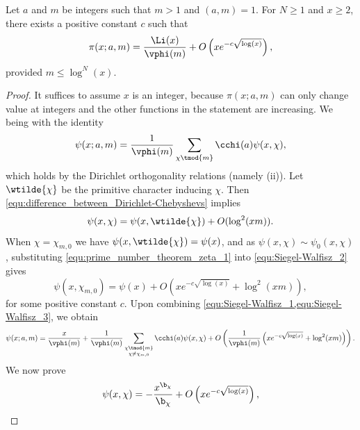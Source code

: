     \begin{theorem*}
      Let \(a\) and \(m\) be integers such that \(m > 1\) and \((a,m) = 1\). For \(N \ge 1\) and \(x \ge 2\), there exists a positive constant \(c\) such that
      \[
        \pi(x;a,m) = \frac{\Li(x)}{\vphi(m)}+O\left(xe^{-c\sqrt{\log(x)}}\right),
      \]
      provided \(m \le \log^{N}(x)\).
    \end{theorem*}
    \begin{proof}
      It suffices to assume \(x\) is an integer, because \(\pi(x;a,m)\) can only change value at integers and the other functions in the statement are increasing. We being with the identity
      \begin{equation}\label{equ:Siegel-Walfisz_1}
        \psi(x;a,m) = \frac{1}{\vphi(m)}\sum_{\chi \tmod{m}}\cchi(a)\psi(x,\chi),
      \end{equation}
      which holds by the Dirichlet orthogonality relations (namely (ii)). Let \(\wtilde{\chi}\) be the primitive character inducing \(\chi\). Then \cref{equ:difference_between_Dirichlet-Chebyshevs} implies
      \begin{equation}\label{equ:Siegel-Walfisz_2}
        \psi(x,\chi) = \psi(x,\wtilde{\chi})+O(\log^{2}(xm)).
      \end{equation}
      When \(\chi = \chi_{m,0}\) we have \(\psi(x,\wtilde{\chi}) = \psi(x)\), and as \(\psi(x,\chi) \sim \psi_{0}(x,\chi)\), substituting \cref{equ:prime_number_theorem_zeta_1} into \cref{equ:Siegel-Walfisz_2} gives
      \begin{equation}\label{equ:Siegel-Walfisz_3}
        \psi(x,\chi_{m,0}) = \psi(x)+O\left(xe^{-c\sqrt{\log(x)}}+\log^{2}(xm)\right),
      \end{equation}
      for some positive constant \(c\). Upon combining \cref{equ:Siegel-Walfisz_1,equ:Siegel-Walfisz_3}, we obtain
      \begin{equation}\label{equ:Siegel-Walfisz_4}
        \psi(x;a,m) = \frac{x}{\vphi(m)}+\frac{1}{\vphi(m)}\sum_{\substack{\chi \tmod{m} \\ \chi \neq \chi_{m,0}}}\cchi(a)\psi(x,\chi)+O\left(\frac{1}{\vphi(m)}\left(xe^{-c\sqrt{\log(x)}}+\log^{2}(xm)\right)\right).
      \end{equation}
      We now prove
      \begin{equation}\label{equ:Siegel-Walfisz_5}
        \psi(x,\chi) = -\frac{x^{\b_{\chi}}}{\b_{\chi}}+O\left(xe^{-c\sqrt{\log(x)}}\right),
      \end{equation}

\end{proof}
